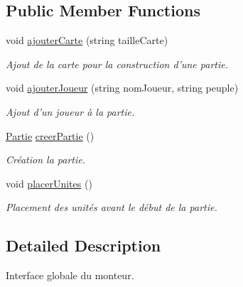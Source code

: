 \subsection*{Public Member Functions}
\begin{DoxyCompactItemize}
\item 
void \hyperlink{interface_small_world_1_1_inter_monteur_partie_a7b74e28c71d27a249cf2fd37dac6ea50}{ajouter\-Carte} (string taille\-Carte)
\begin{DoxyCompactList}\small\item\em Ajout de la carte pour la construction d'une partie. \end{DoxyCompactList}\item 
void \hyperlink{interface_small_world_1_1_inter_monteur_partie_a331382da196f9c2deb9deb3e19086be1}{ajouter\-Joueur} (string nom\-Joueur, string peuple)
\begin{DoxyCompactList}\small\item\em Ajout d'un joueur à la partie. \end{DoxyCompactList}\item 
\hypertarget{interface_small_world_1_1_inter_monteur_partie_a79bd17727ddd45354772768ae50bc44b}{\hyperlink{interface_small_world_1_1_partie}{Partie} \hyperlink{interface_small_world_1_1_inter_monteur_partie_a79bd17727ddd45354772768ae50bc44b}{creer\-Partie} ()}\label{interface_small_world_1_1_inter_monteur_partie_a79bd17727ddd45354772768ae50bc44b}

\begin{DoxyCompactList}\small\item\em Création la partie. \end{DoxyCompactList}\item 
\hypertarget{interface_small_world_1_1_inter_monteur_partie_ada278abeae2393e090f0775bde5ad100}{void \hyperlink{interface_small_world_1_1_inter_monteur_partie_ada278abeae2393e090f0775bde5ad100}{placer\-Unites} ()}\label{interface_small_world_1_1_inter_monteur_partie_ada278abeae2393e090f0775bde5ad100}

\begin{DoxyCompactList}\small\item\em Placement des unités avant le début de la partie. \end{DoxyCompactList}\end{DoxyCompactItemize}


\subsection{Detailed Description}
Interface globale du monteur. 

